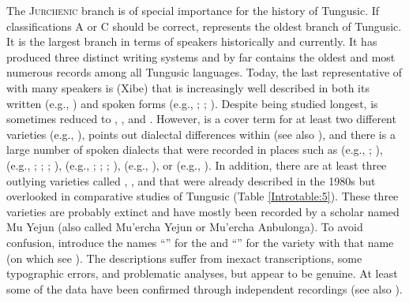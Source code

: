 \documentclass[output=paper,colorlinks,citecolor=brown]{langscibook}
\begin{document}
The \textsc{Jurchenic} branch is of special importance for the history of Tungusic. If classifications A or C should be correct,  represents the oldest branch of Tungusic. It is the largest branch in terms of speakers historically and currently. It has produced three distinct writing systems and by far contains the oldest and most numerous records among all Tungusic languages. Today, the last representative of  with many speakers is  (Xibe) that is increasingly well described in both its written (e.g., \citealt{Stary2017}) and spoken forms (e.g., \citealt{Jang2020}; \citealt{JangPayne2018}; \citealt{Zikmundová2013a}). Despite being studied longest,  is sometimes reduced to , , and . However,  is a cover term for at least two different varieties (e.g., \citealt{Kiyose2000}),  points out dialectal differences within  (see also \citealt{Zheng2019}), and there is a large number of spoken  dialects that were recorded in places such as  (e.g., \citealt{Shirokogoroff1924}; \citealt{WangQingfeng2005}),  (e.g., \citealt{MuYejun1986b}; \citealt{Ma1997c}; \citealt{Wang2001}; \citealt{Aixinjueluo2014}),  (e.g., \citealt{JinQizong1981}; \citealt{Enhebatu1995}; \citealt{KimJuwon2008}; \citealt{DaiGuangyu2012}),  (e.g., \citealt{ZhaoJie2000}), or  (e.g., \citealt{ZhaoJie1989}). In addition, there are at least three outlying  varieties called , , and  that were already described in the 1980s but overlooked in comparative studies of Tungusic (Table \ref{Introtable:5}). These three varieties are probably extinct and have mostly been recorded by a scholar named Mu Yejun (also called Mu’ercha Yejun or Mu’ercha Anbulonga). To avoid confusion, \citet[90]{HölzlHölzl2019a} introduce the names “” for the  and “” for the  variety with that name (on which see ). The descriptions suffer from inexact transcriptions, some typographic errors, and problematic analyses, but appear to be genuine. At least some of the data have been confirmed through independent recordings (see also \citealt{Ma1997a, Ma1997b, Ma1997c, Ma1997d}).
\end{document}
